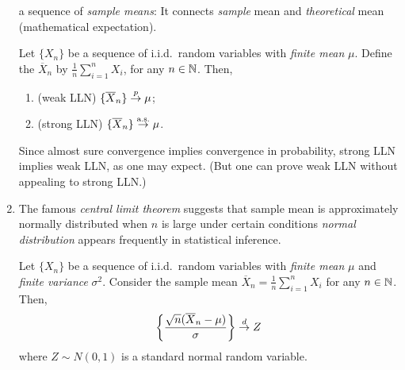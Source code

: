 \begin{enumerate}
a sequence of \emph{sample means}: It connects \emph{sample} mean and
\emph{theoretical} mean (mathematical expectation).
\begin{theorem}
\label{thm:weak-strong-lln}
Let \(\{X_n\}\) be a sequence of i.i.d.\ random variables with \emph{finite mean}
\(\mu\). Define the  \(\overline{X}_n\) by \(
\frac{1}{n}\sum_{i=1}^{n}X_i\), for any \(n\in\mathbb{N}\). Then,
\begin{enumerate}
\item (weak LLN) \(\{\overline{X}_n\}\overset{p}{\to}\mu\);
\item (strong LLN) \(\{\overline{X}_n\}\overset{\text{a.s.}}{\to}\mu\).
\end{enumerate}
\end{theorem}
\begin{note}
Since almost sure convergence implies convergence in probability, strong LLN
implies weak LLN, as one may expect. (But one can prove weak LLN without
appealing to strong LLN.)
\end{note}
\item The famous \emph{central limit theorem} suggests that sample mean is
approximately normally distributed when \(n\) is large under certain conditions
 \emph{normal distribution} appears frequently in
statistical inference.
\begin{theorem}
\label{thm:clt}
Let \(\{X_n\}\) be a sequence of i.i.d.\ random variables with \emph{finite
mean} \(\mu\) and \emph{finite variance} \(\sigma^2\). Consider the sample mean
\(\overline{X}_n=\frac{1}{n}\sum_{i=1}^{n}X_i\) for any \(n\in\mathbb{N}\). Then,
\[
\left\{\frac{\sqrt{n}(\overline{X}_n-\mu)}{\sigma}\right\}\overset{d}{\to} Z
\]
where \(Z\sim N(0,1)\) is a standard normal random variable.
\end{theorem}
\end{enumerate}
